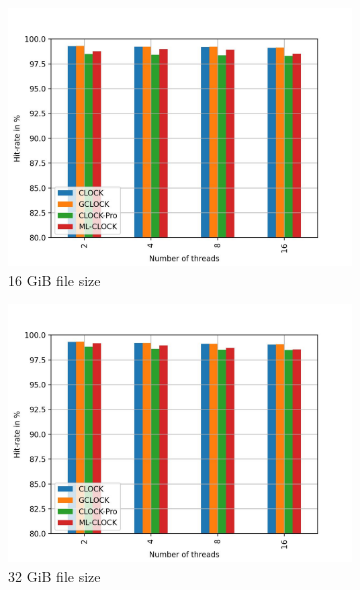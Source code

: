 \documentclass[
	12pt,
	a4paper,
	abstract,
	bibliography=totoc,
	chapterprefix,
	headings=openright,
	numbers=endperiod,
	parskip=half,
	twoside,
]{scrreprt}
\begin{document}
\begin{figure}[H]
	\centering
	\begin{subfigure}{0.4\textwidth}
		\includegraphics[width=\textwidth]{multi_16_gb_randread_zipf.jpg}		
		\caption{16 GiB file size}
		\label{fig:read 16 zipf}
	\end{subfigure}
	\hfill
	\begin{subfigure}{0.4\textwidth}
		\includegraphics[width=\textwidth]{multi_32_gb_randread_zipf.jpg}		
		\caption{32 GiB file size}
		\label{fig:read 32 zipf}
	\end{subfigure}
	\hfill
	\begin{subfigure}{0.4\textwidth}

\end{subfigure}
\end{figure}
\end{document}
